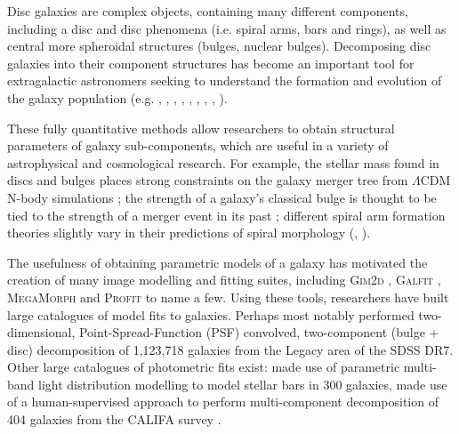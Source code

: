 \documentclass[../main.tex]{subfiles}
\begin{document}
\label{sec:introduction}

Disc galaxies are complex objects, containing many different components, including a disc and disc phenomena (i.e. spiral arms, bars and rings), as well as central more spheroidal structures (bulges, nuclear bulges). Decomposing disc galaxies into their component structures has become an important tool for extragalactic astronomers seeking to understand the formation and evolution of the galaxy population (e.g. \citealt{Simard2002:astro-ph/0205025v2}, \citealt{2011ApJS..196...11S}, \citealt{2012MNRAS.421.2277L}, \citealt{2017MNRAS.469.3363K}, \citealt{megamorph-paper}, \citealt{2011MNRAS.415.3308G}, \citealt{Mendez-Abreu2016:1610.05324v1}, \citealt{Park2006:astro-ph/0611610v2}, \citealt{2015ApJS..219....4S}).

These fully quantitative methods allow researchers to obtain structural parameters of galaxy sub-components, which are useful in a variety of astrophysical and cosmological research. For example, the stellar mass found in discs and bulges places strong constraints on the galaxy merger tree from $\Lambda\mathrm{CDM}$ N-body simulations \citep{Hopkins2010:1004.2708v3}; the strength of a galaxy's classical bulge is thought to be tied to the strength of a merger event in its past \citep{Kormendy2010:1009.3015v1}; different spiral arm formation theories slightly vary in their predictions of spiral morphology (\citealt{Dobbs2014:1407.5062v1}, \citealt{Pour-Imani2016:1608.00969v1} \citealt{2017MNRAS.472.2263H}).

The usefulness of obtaining parametric models of a galaxy has motivated the creation of many image modelling and fitting suites, including \textsc{Gim2d} \citep{gim2d-paper}, \textsc{Galfit} \citep{galfit-paper}, \textsc{MegaMorph} \citep{megamorph-paper} and \textsc{Profit} \citep{profit-paper} to name a few. Using these tools, researchers have built large catalogues of model fits to galaxies. Perhaps most notably \citet{2011ApJS..196...11S} performed two-dimensional, Point-Spread-Function (PSF) convolved, two-component (bulge + disc) decomposition of 1,123,718 galaxies from the Legacy area of the SDSS DR7. Other large catalogues of photometric fits exist: \cite{2011MNRAS.415.3308G} made use of parametric multi-band light distribution modelling to model stellar bars in 300 galaxies, \cite{Mendez-Abreu2016:1610.05324v1} made use of a human-supervised approach to perform multi-component decomposition of 404 galaxies from the CALIFA survey \citep{Sanchez2011:1111.0962v2}.
\end{document}
